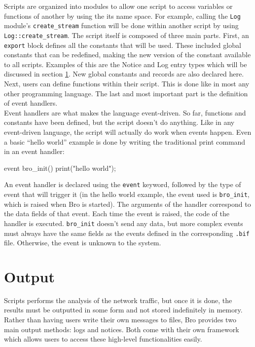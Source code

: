Scripts are organized into modules to allow one script to access variables or functions of another by using the its name space. For example, calling the \texttt{Log} module's \texttt{create\_stream} function will be done within another script by using \texttt{Log::create\_stream}. The script itself is composed of three main parts. First, an \texttt{export} block defines all the constants that will be used. These included global constants that can be redefined, making the new version of the constant available to all scripts. Examples of this are the Notice and Log entry types which will be discussed in section \ref{output}. New global constants and records are also declared here. Next, users can define functions within their script. This is done like in most any other programming language. The last and most important part is the definition of event handlers. \\

Event handlers are what makes the language event-driven. So far, functions and constants have been defined, but the script doesn't do anything. Like in any event-driven language, the script will actually do work when events happen. Even a basic ``hello world'' example is done by writing the traditional print command in an event handler: \\

\begin{code}
event bro_init() {
	print("hello world\n");	
}
\end{code}

An event handler is declared using the \texttt{event} keyword, followed by the type of event that will trigger it (in the hello world example, the event used is \texttt{bro\_init}, which is raised when Bro is started). The arguments of the handler correspond to the data fields of that event. Each time the event is raised, the code of the handler is executed. \texttt{bro\_init} doesn't send any data, but more complex events must always have the same fields as the events defined in the corresponding \texttt{.bif} file. Otherwise, the event is unknown to the system.

\section{Output} \label{output}
Scripts performs the analysis of the network traffic, but once it is done, the results must be outputted in some form and not stored indefinitely in memory. Rather than having users write their own messages to files, Bro provides two main output methods: logs and notices. Both come with their own framework which allows users to access these high-level functionalities easily.

